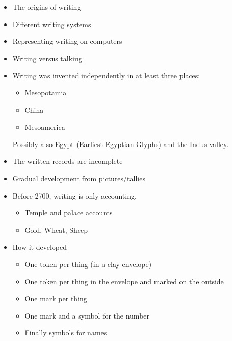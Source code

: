 \documentclass[a4paper,landscape,headrule,footrule,xetex]{foils}
\begin{document}


\maketitle


\begin{itemize}
\item The origins of writing %
\item Different writing systems
\item Representing writing on computers
\item Writing versus talking
\end{itemize}

\begin{itemize}
\item Writing was invented independently in at least three places:
  \begin{itemize}
  \item Mesopotamia
  \item China
  \item Mesoamerica
  \end{itemize}
  Possibly also Egypt
  (\href{https://archive.archaeology.org/9903/newsbriefs/egypt.html}{Earliest
  Egyptian Glyphs}) and the Indus valley.
\item The written records are incomplete
\item Gradual development from pictures/tallies
\end{itemize}


\begin{itemize}
\item Before 2700, writing is only accounting.
  \begin{itemize}
  \item Temple and palace accounts
  \item Gold, Wheat, Sheep
  \end{itemize}
\item How it developed
  \begin{itemize}
  \item One token per thing (in a clay envelope)
  \item One token per thing in the envelope and marked on the outside
  \item One mark per thing
  \item One mark and a symbol for the number
  \item Finally symbols for names
  \end{itemize}
\end{itemize}
\end{document}
